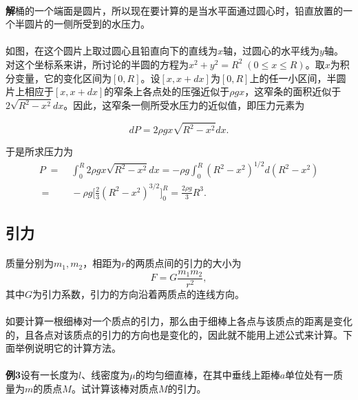 \paragraph{}
\textbf{解\;}桶的一个端面是圆片，所以现在要计算的是当水平面通过圆心时，铅直放置的一个半圆片的一侧所受到的水压力。

\paragraph{}
如图，在这个圆片上取过圆心且铅直向下的直线为$x$轴，过圆心的水平线为$y$轴。对这个坐标系来讲，所讨论的半圆的方程为$x^2+y^2=R^2 \; (0\leq x\leq R)$。取$x$为积分变量，它的变化区间为$[0,R]$。设$[x,x+dx]$为$[0,R]$上的任一小区间，半圆片上相应于$[x,x+dx]$的窄条上各点处的压强近似于$\rho gx$，这窄条的面积近似于$\displaystyle 2\sqrt{R^2-x^2}dx$。因此，这窄条一侧所受水压力的近似值，即压力元素为

\begin{equation}
dP = 2\rho gx \sqrt{R^2-x^2}dx.
\end{equation}

于是所求压力为
\begin{align}
  P \;=&\; \int_0^R 2\rho gx \sqrt{R^2-x^2}dx = -\rho g\int_0^R(R^2-x^2)^{1/2}d(R^2-x^2) \\
  \;=&\; -\rho g\big[ \frac{2}{3}(R^2-x^2)^{3/2} \big]_0^R = \frac{2\rho g}{3}R^3.
\end{align}

\subsection{引力}
\paragraph{}
质量分别为$m_1, m_2$，相距为$r$的两质点间的引力的大小为
\begin{equation}
  F = G\frac{m_1m_2}{r^2},
\end{equation}
其中$G$为引力系数，引力的方向沿着两质点的连线方向。

\paragraph{}
如要计算一根细棒对一个质点的引力，那么由于细棒上各点与该质点的距离是变化的，且各点对该质点的引力的方向也是变化的，因此就不能用上述公式来计算。下面举例说明它的计算方法。

\paragraph{}
\textbf{例3\;}设有一长度为$l$、线密度为$\mu$的均匀细直棒，在其中垂线上距棒$a$单位处有一质量为$m$的质点$M$。试计算该棒对质点$M$的引力。

